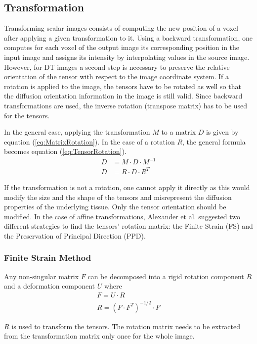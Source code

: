 \documentclass{InsightArticle}
\begin{document}
\subsection{Transformation}

Transforming scalar images consists of computing the new position of a voxel after applying a given transformation to it. Using a backward transformation, one computes for each voxel of the output image its corresponding position in the input image and assigns its intensity by interpolating values in the source image. However, for DT images a second step is necessary to preserve the relative orientation of the tensor with respect to the image coordinate system. If a rotation is applied to the image, the tensors have to be rotated as well so that the diffusion orientation information in the image is still valid. Since backward transformations are used, the inverse rotation (transpose matrix) has to be used for the tensors.

In the general case, applying the transformation $M$ to a matrix $D$ is given by equation (\ref{eq:MatrixRotation}). In the case of a rotation $R$, the general formula becomes equation (\ref{eq:TensorRotation}).
\begin{align}
\label{eq:MatrixRotation}
D &= M \cdot D \cdot M^{-1}\\
\label{eq:TensorRotation}
D &= R \cdot D \cdot R^{T}
\end{align} 

If the transformation is not a rotation, one cannot apply it directly as this would modify the size and the shape of the tensors and misrepresent the diffusion properties of the underlying tissue. Only the tensor orientation should be modified. In the case of affine transformations, Alexander et al. \cite{Alexander2001} suggested two different strategies to find the tensors' rotation matrix: the Finite Strain (FS) and the Preservation of Principal Direction (PPD).

\subsubsection{Finite Strain Method}
Any non-singular matrix $F$ can be decomposed into a rigid rotation component $R$ and a deformation component $U$ where
\begin{gather}
F = U \cdot R\\
R = (F \cdot F^{T} )^{-{1/2}} \cdot F
\end{gather}

$R$ is used to transform the tensors. The rotation matrix needs to be extracted from the transformation matrix only once for the whole image.
\end{document}
